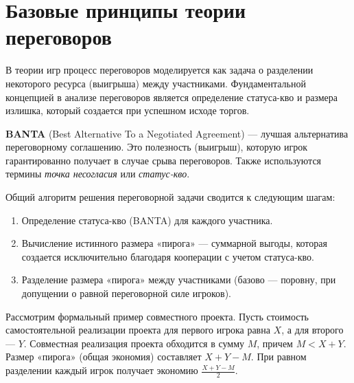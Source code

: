 \section{Базовые принципы теории переговоров}

В теории игр процесс переговоров моделируется как задача о разделении некоторого ресурса (выигрыша) между участниками. Фундаментальной концепцией в анализе переговоров является определение статуса-кво и размера излишка, который создается при успешном исходе торгов.

\begin{definition}
\textbf{BANTA} (Best Alternative To a Negotiated Agreement) — лучшая альтернатива переговорному соглашению. Это полезность (выигрыш), которую игрок гарантированно получает в случае срыва переговоров. Также используются термины \textit{точка несогласия} или \textit{статус-кво}.
\end{definition}

Общий алгоритм решения переговорной задачи сводится к следующим шагам:
\begin{enumerate}
    \item Определение статуса-кво (BANTA) для каждого участника.
    \item Вычисление истинного размера «пирога» — суммарной выгоды, которая создается исключительно благодаря кооперации с учетом статуса-кво.
    \item Разделение размера «пирога» между участниками (базово — поровну, при допущении о равной переговорной силе игроков).
\end{enumerate}

Рассмотрим формальный пример совместного проекта. Пусть стоимость самостоятельной реализации проекта для первого игрока равна $X$, а для второго — $Y$. Совместная реализация проекта обходится в сумму $M$, причем $M < X + Y$. 
Размер «пирога» (общая экономия) составляет $X + Y - M$. При равном разделении каждый игрок получает экономию $\frac{X + Y - M}{2}$.


